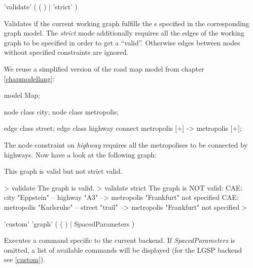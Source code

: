 \begin{rail}
  'validate' ( ( ) | 'strict' )
\end{rail}
Validates if the current working graph fulfills the s specified in the corresponding graph model. The \emph{strict} mode additionally requires all the edges of the working graph to be specified in order to get a ``valid''. Otherwise edges between nodes without specified constraints are ignored.\\
\begin{example}
We reuse a simplified version of the road map model from chapter \ref{chapmodellang}:
\begin{grgen} 
model Map;

node class city;
node class metropolis;

edge class street;
edge class highway
      connect metropolis [+] -> metropolis [+];
\end{grgen}
The node constraint on \emph{highway} requires all the metropolises to be connected by highways. Now have a look at the following graph:
\begin{center}
\end{center}

This graph is valid but not strict valid.
\begin{grshell} 
> validate
The graph is valid.
> validate strict
The graph is NOT valid:
  CAE: city "Eppstein" -- highway "A3" --> metropolis "Frankfurt" not specified
  CAE: metropolis "Karlsruhe" -- street "trail" --> metropolis "Frankfurt" not specified
>
\end{grshell}
\end{example}

\begin{rail}
  'custom' 'graph' ( ( ) | SpacedParameters )
\end{rail}
Executes a command specific to the current backend. If \emph{SpacedParameters} is omitted, a list of available commands will be displayed (for the LGSP backend see \ref{custom}).

